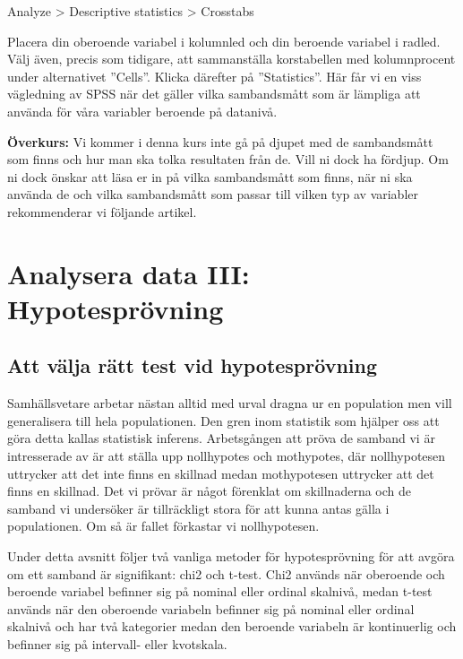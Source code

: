 \documentclass[
]{book}
\begin{document}
Analyze \textgreater{} Descriptive statistics \textgreater{} Crosstabs

Placera din oberoende variabel i kolumnled och din beroende variabel i radled. Välj även, precis som
tidigare, att sammanställa korstabellen med kolumnprocent under alternativet ''Cells''. Klicka därefter
på ''Statistics''. Här får vi en viss vägledning av SPSS när det gäller vilka sambandsmått som är lämpliga att använda för våra variabler beroende på datanivå.

\textbf{Överkurs:}
Vi kommer i denna kurs inte gå på djupet med de sambandsmått som finns och hur man ska tolka resultaten från de. Vill ni dock ha fördjup. Om ni dock önskar att läsa er in på vilka sambandsmått som finns, när ni ska använda de och vilka sambandsmått som passar till vilken typ av variabler rekommenderar vi följande artikel.

\hypertarget{part-analysera-data-iii-hypotespruxf6vning}{%
\part*{Analysera data III: Hypotesprövning}\label{part-analysera-data-iii-hypotespruxf6vning}}

\hypertarget{att-vuxe4lja-ruxe4tt-test-vid-hypotespruxf6vning}{%
\chapter{Att välja rätt test vid hypotesprövning}\label{att-vuxe4lja-ruxe4tt-test-vid-hypotespruxf6vning}}

Samhällsvetare arbetar nästan alltid med urval dragna ur en population men vill generalisera till hela
populationen. Den gren inom statistik som hjälper oss att göra detta kallas statistisk inferens.
Arbetsgången att pröva de samband vi är intresserade av är att ställa upp nollhypotes och mothypotes,
där nollhypotesen uttrycker att det inte finns en skillnad medan mothypotesen uttrycker att det finns
en skillnad. Det vi prövar är något förenklat om skillnaderna och de samband vi undersöker är tillräckligt
stora för att kunna antas gälla i populationen. Om så är fallet förkastar vi nollhypotesen.

Under detta avsnitt följer två vanliga metoder för hypotesprövning för att avgöra om ett samband är
signifikant: chi2 och t-test. Chi2 används när oberoende och beroende variabel befinner sig på nominal
eller ordinal skalnivå, medan t-test används när den oberoende variabeln befinner sig på nominal eller
ordinal skalnivå och har två kategorier medan den beroende variabeln är kontinuerlig och befinner sig
på intervall- eller kvotskala.
\end{document}
